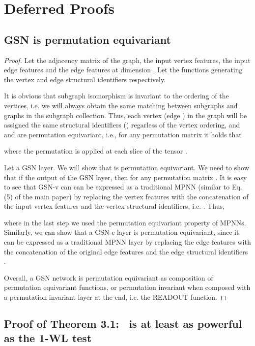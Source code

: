 \section{Deferred Proofs} 

\subsection{GSN is permutation equivariant}\label{proof:perm_equiv}

\begin{proof}
Let  the adjacency matrix of the graph,  the input vertex features,  the input edge features and  the edge features at dimension . Let  the functions generating the vertex and edge structural identifiers respectively. 

It is obvious that subgraph isomorphism is invariant to the ordering of the vertices, i.e. we will always obtain the same matching between subgraphs  and graphs  in the subgraph collection. Thus, each vertex  (edge ) in the graph will be assigned the same structural identifiers  () regarless of the vertex ordering, and  and  are permutation equivariant, i.e., for any permutation matrix  it holds that 

where the permutation is applied at each slice  of the tensor .



Let  a GSN layer. We will show that  is permutation equivariant.  We need to show that if  the output of the GSN layer, then  for any permutation matrix . It is easy to see that GSN-v can can be expressed as a traditional MPNN  (similar to Eq. (5) of the main paper) by replacing the vertex features  with the concatenation of the input vertex features and the vertex structural identifiers, i.e. . Thus, 


where in the last step we used the permutation equivariant property of MPNNs. Similarly, we can show that a GSN-e layer is permutation equivariant, since it can be expressed as a traditional MPNN layer by replacing the edge features with the concatenation of the original edge features and the edge structural identifiers .

Overall, a GSN network is permutation equivariant as composition of permutation equivariant functions, or permutation invariant when composed with a permutation invariant layer at the end, i.e. the READOUT function.

\end{proof}

\subsection{Proof of Theorem 3.1: {\modelname\ is at least as powerful as the 1-WL test}}\label{sec:proof_1}

